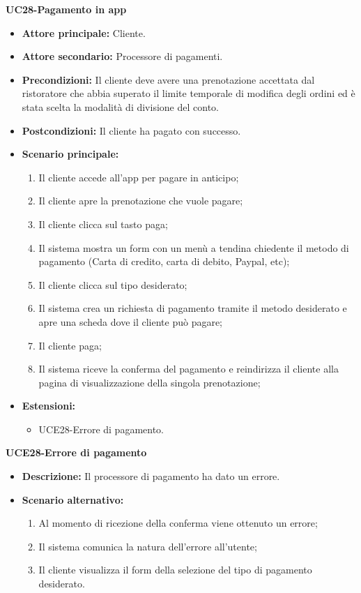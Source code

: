\textbf{UC28-Pagamento in app}
\begin{itemize}
\item \textbf{Attore principale:} Cliente.
\item \textbf{Attore secondario:} Processore di pagamenti.
\item \textbf{Precondizioni:} Il cliente deve avere una prenotazione accettata dal ristoratore che abbia superato il
  limite temporale di modifica degli ordini ed è stata scelta la modalità di divisione del conto.
\item \textbf{Postcondizioni:} Il cliente ha pagato con successo.
\item \textbf{Scenario principale:}
\begin{enumerate}
    \item Il cliente accede all'app per pagare in anticipo;
    \item Il cliente apre la prenotazione che vuole pagare;
    \item Il cliente clicca sul tasto paga;
    \item Il sistema mostra un form con un menù a tendina chiedente il metodo di pagamento
      (Carta di credito, carta di debito, Paypal, etc);
    \item Il cliente clicca sul tipo desiderato;
    \item Il sistema crea un richiesta di pagamento tramite il metodo desiderato e 
      apre una scheda dove il cliente può pagare;
    \item Il cliente paga;
    \item Il sistema riceve la conferma del pagamento e reindirizza il cliente alla pagina di visualizzazione della singola prenotazione;
\end{enumerate}
    \item \textbf{Estensioni:}
        \begin{itemize}
                \item UCE28-Errore di pagamento.
        \end{itemize}
\end{itemize}

\textbf{UCE28-Errore di pagamento}
\begin{itemize}
\item \textbf{Descrizione: } Il processore di pagamento ha dato un errore.
\item \textbf{Scenario alternativo:}
\begin{enumerate}
    \item Al momento di ricezione della conferma viene ottenuto un errore;
    \item Il sistema comunica la natura dell'errore all'utente;
    \item Il cliente visualizza il form della selezione del tipo di pagamento desiderato.
\end{enumerate}
\end{itemize}

